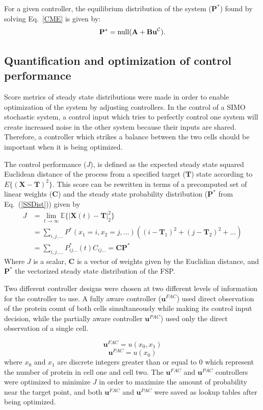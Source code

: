 \documentclass[12pt]{article}
\begin{document}
For a given controller, the equilibrium distribution of the system ($\mathbf{P}^*$) found by solving Eq.\ \ref{CME} is given by:
\begin{equation}
\mathbf{P}^*={\rm null}(\mathbf{A}+\textbf{Bu}^{\mathcal{C}}).\label{SSDist}
\end{equation}


\subsection{Quantification and optimization of control performance}
Score metrics of steady state distributions were made in order to enable optimization of the system by adjusting controllers. In the control of a SIMO stochastic system, a control input which tries to perfectly control one system will create increased noise in the other system because their inputs are shared. Therefore, a controller which strikes a balance between the two cells should be important when it is being optimized.

 The control performance ($J$), is defined as the expected steady state squared Euclidean distance of the process from a specified target ($\mathbf{T}$) state according to $E\{(\mathbf{X}-\mathbf{T})^2\}$. This score can be rewritten in terms of a precomputed set of linear weights ($\mathbf{C}$) and the steady state probability distribution ($\mathbf{P}^*$ from Eq.\ (\ref{SSDist})) given by
{\small \begin{align}
J&= \lim_{t\rightarrow \infty}\mathbb{E}\{|\mathbf{X}(t)-\mathbf{T}|_2^2\} \nonumber \\ 
&=\sum_{i,j,\ldots} P^*(x_1=i,x_2=j,\ldots) ((i-\mathbf T_1)^2 + (j-\mathbf T_2)^2 +\ldots)\nonumber  \\
&=\sum_{i,j,\ldots} P^*_{ij\ldots}(t)C_{ij\ldots} =\mathbf{C}\mathbf{P}^*
\label{Euclid}
\end{align}}
Where $J$ is a scalar, $\mathbf{C}$ is a vector of weights given by the Euclidian distance, and $\mathbf{P}^*$ the vectorized steady state distribution of the FSP.

Two different controller designs were chosen at two different levels of information for the controller to use. A fully aware controller ($\mathbf{u}^{FAC}$) used direct observation of the protein count of both cells simultaneously while making its control input decision, while the partially aware controller $\mathbf{u}^{PAC}$) used only the direct observation of a single cell. 

\begin{equation}
\mathbf{u}^{FAC}=u(x_0,x_1)
\end{equation}
\begin{equation}
\mathbf{u}^{PAC}=u(x_0)
\end{equation}
where $x_0$ and $x_1$ are discrete integers greater than or equal to 0 which represent the number of protein in cell one and cell two.  The $\mathbf{u}^{FAC}$ and $\mathbf{u}^{PAC}$ controllers were optimized to minimize $J$ in order to maximize the amount of probability near the target point, and both $\mathbf{u}^{FAC}$ and $\mathbf{u}^{PAC}$ were saved as lookup tables after being optimized.
\end{document}

